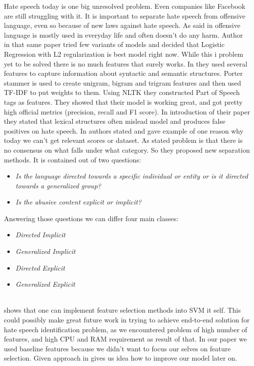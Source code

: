 \documentclass[10pt, a4paper]{article}
\begin{document}
Hate speech today is one big unresolved problem. Even companies like Facebook are still struggling with it. It is important to separate hate speech from offensive language, even so because of new laws against hate speech\cite{Davidson2017AutomatedHS}. As said in \cite{Davidson2017AutomatedHS} offensive language is mostly used in everyday life and often doesn't do any harm. Author in that same paper tried few variants of models and decided that Logistic Regression with L2 regularization is best model right now.
While this i problem yet to be solved there is no much features that surely works. In \cite{Davidson2017AutomatedHS} they used several features to capture information about syntactic and semantic structures. Porter stammer is used to create unigram, bigram and trigram features and then used TF-IDF to put weights to them. Using NLTK they constructed Part of Speech tags as features. They showed that their model is working great, and got pretty high official metrics (precision, recall and F1 score). In introduction of their paper they stated that lexical structures often mislead model and produces false positives on hate speech.
In \cite{WaseemUnderstandingAbuse} authors stated and gave example of one reason why today we can't get relevant scores or dataset. As stated problem is that there is no consensus on what falls under what category. So they proposed new separation methods. It is contained out of two questions:
\begin{itemize}
	\item \textit{Is the language directed towards a specific individual or entity or is it directed towards a generalized group?}
	\item \textit{Is the abusive content explicit or implicit?}
\end{itemize}
Answering those questions we can differ four main classes:
\begin{itemize}
	\item \textit{Directed Implicit}
	\item \textit{Generalized Implicit}
	\item \textit{Directed Explicit}
	\item \textit{Generalized Explicit}
\end{itemize}
\\\cite{ChenSVMFeatures} shows that one can implement feature selection methods into SVM it self. This could possibly make great future work in trying to achieve end-to-end solution for hate speech identification problem, as we encountered problem of high number of features, and high CPU and RAM requirement as result of that. In our paper we used baseline features because we didn't want to focus our selves on feature selection. Given approach in \cite{ChenSVMFeatures} gives us idea how to improve our model later on.
\end{document}
